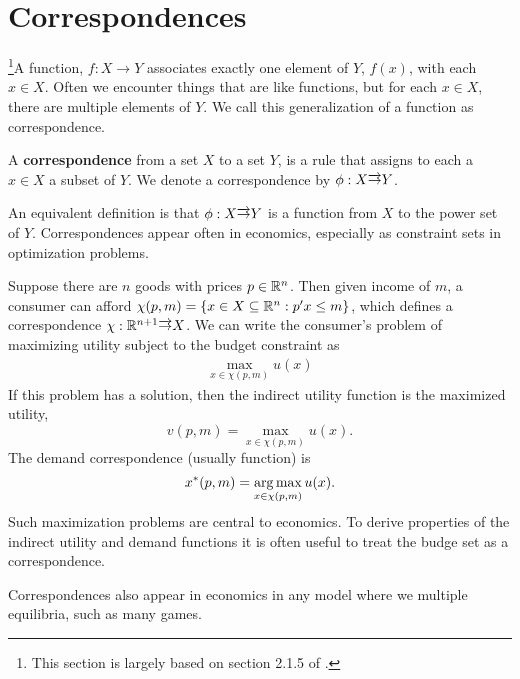 \section{Correspondences \label{sec:corr}} 

\footnote{This section is largely based on section 2.1.5 of
  \cite{carter2001}.}A function, $f:X \to Y$ associates exactly one
element of $Y$, $f(x)$, with each $x \in X$. Often we encounter things
that are like functions, but for each $x \in X$, there are multiple
elements of $Y$. We call this generalization of a function as
correspondence.
\begin{definition}
  A \textbf{correspondence} from a set $X$ to a set $Y$, is a rule
  that assigns to each a $x \in X$ a subset of $Y$. We denote a
  correspondence by $\phi: X \overrightarrow{\rightarrow} Y$.
\end{definition}
An equivalent definition is that $\phi: X \overrightarrow{\rightarrow} Y$ is a function
from $X$ to the power set of $Y$. Correspondences appear often in
economics, especially as constraint sets in optimization problems.
\begin{example}
  Suppose there are $n$ goods with prices $p \in \mathbb{R}^n$. Then given
  income of $m$, a consumer can afford $\chi(p,m)=\{ x \in X \subseteq
  \mathbb{R}^n: p'x \leq m\}$, which defines a correspondence $\chi: \mathbb{R}^{n+1}
  \overrightarrow{\rightarrow} X$. We can write the consumer's problem of maximizing
  utility subject to the budget constraint as
  \begin{align*}
    \max_{x \in \chi(p,m)} u(x) 
  \end{align*}
  If this problem has a solution, then the indirect utility function
  is the maximized utility,
  \[ v(p,m) = \max_{x \in \chi(p,m)} u(x). \]
  The demand correspondence (usually function) is
  \[ x^*(p,m) = \argmax_{x \in \chi(p,m)} u(x). \] 
  Such maximization problems are central to economics. To derive
  properties of the indirect utility and demand functions it is often
  useful to treat the budge set as a correspondence.
\end{example}
Correspondences also appear in economics in any model where we
multiple equilibria, such as many games. 

